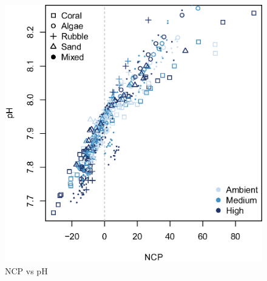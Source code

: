 \documentclass{article}%
\begin{document}
\begin{figure}[!h]
\centering\includegraphics[width=6.5in]{NCPvspH.eps}
\caption{NCP vs pH}
\label{NCPvspH}
\end{figure}
\end{document}

